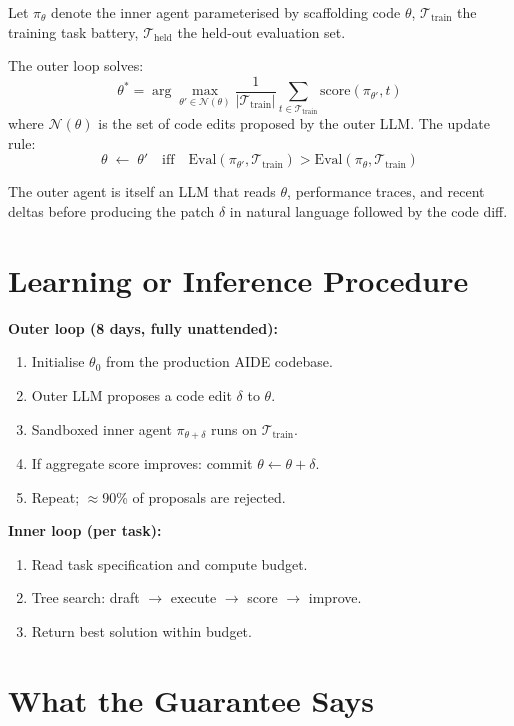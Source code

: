 \documentclass[10pt,twocolumn]{article}
\begin{document}
Let $\pi_\theta$ denote the inner agent parameterised by scaffolding code $\theta$,
$\mathcal{T}_{\mathrm{train}}$ the training task battery,
$\mathcal{T}_{\mathrm{held}}$ the held-out evaluation set.

The outer loop solves:
\[
\theta^* = \arg\max_{\theta' \in \mathcal{N}(\theta)}
  \frac{1}{|\mathcal{T}_{\mathrm{train}}|}
  \sum_{t \in \mathcal{T}_{\mathrm{train}}} \mathrm{score}(\pi_{\theta'}, t)
\]
where $\mathcal{N}(\theta)$ is the set of code edits proposed by the outer LLM.
The update rule:
\[
\theta \;\leftarrow\; \theta' \quad \text{iff} \quad
  \mathrm{Eval}(\pi_{\theta'}, \mathcal{T}_{\mathrm{train}})
  > \mathrm{Eval}(\pi_\theta, \mathcal{T}_{\mathrm{train}})
\]

The outer agent is itself an LLM that reads $\theta$, performance traces, and
recent deltas before producing the patch $\delta$ in natural language followed
by the code diff.

\section{Learning or Inference Procedure}

\textbf{Outer loop (8 days, fully unattended):}
\begin{enumerate}[itemsep=2pt,parsep=0pt]
  \item Initialise $\theta_0$ from the production AIDE codebase.
  \item Outer LLM proposes a code edit $\delta$ to $\theta$.
  \item Sandboxed inner agent $\pi_{\theta+\delta}$ runs on $\mathcal{T}_{\mathrm{train}}$.
  \item If aggregate score improves: commit $\theta \leftarrow \theta + \delta$.
  \item Repeat; $\approx$90\% of proposals are rejected.
\end{enumerate}

\textbf{Inner loop (per task):}
\begin{enumerate}[itemsep=2pt,parsep=0pt]
  \item Read task specification and compute budget.
  \item Tree search: draft $\to$ execute $\to$ score $\to$ improve.
  \item Return best solution within budget.
\end{enumerate}

\section{What the Guarantee Says}
\end{document}
